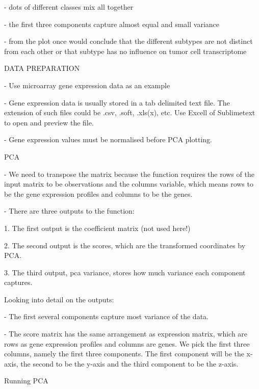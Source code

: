 \documentclass[11pt, oneside]{article}   	%
\begin{document}
- dots of different classes mix all together

- the first three components capture almost equal and small variance

- from the plot once would conclude that the different subtypes are not distinct from each other or that subtype has no influence on tumor cell transcriptome



DATA PREPARATION

- Use microarray gene expression data as an example

- Gene expression data is usually stored in a tab delimited text file. The extension of such files could be .csv, .soft, .xls(x), etc. Use Excell of Sublimetext to open and preview the file.

- Gene expression values must be normalised before PCA plotting.


PCA

- We need to transpose the matrix because the function requires the rows of the input matrix to be observations and the columns variable, which means rows to be the gene expression profiles and columns to be the genes.

- There are three outputs to the function:

1. The first output is the coefficient matrix (not used here!)

2. The second output is the scores, which are the transformed coordinates by PCA.

3. The third output, pca variance, stores how much variance each component captures.


Looking into detail on the outputs:

- The first several components capture most variance of the data.

- The score matrix has the same arrangement as expression matrix, which are rows as gene expression profiles and columns are genes. We pick the first three columns, namely the first three components. The first component will be the x-axis, the second to be the y-axis and the third component to be the z-axis.

Running PCA

%
%
%
%
\end{document}
